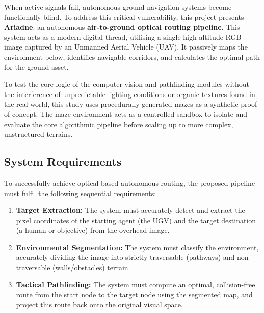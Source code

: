 \documentclass[12pt, a4paper]{article}
\begin{document}
\vspace{0.5cm}

When active signals fail, autonomous ground navigation systems become functionally blind. To address this critical vulnerability, this project presents \textbf{Ariadne}: an autonomous \textbf{air-to-ground optical routing pipeline}. This system acts as a modern digital thread, utilising a single high-altitude RGB image captured by an Unmanned Aerial Vehicle (UAV). It passively maps the environment below, identifies navigable corridors, and calculates the optimal path for the ground asset.

\vspace{0.5cm}

To test the core logic of the computer vision and pathfinding modules without the interference of unpredictable lighting conditions or organic textures found in the real world, this study uses procedurally generated mazes as a synthetic proof-of-concept. The maze environment acts as a controlled sandbox to isolate and evaluate the core algorithmic pipeline before scaling up to more complex, unstructured terrains.

\vspace{0.5cm}

\subsection{System Requirements}

To successfully achieve optical-based autonomous routing, the proposed pipeline must fulfil the following sequential requirements:

\begin{enumerate}
    \item \textbf{Target Extraction:} The system must accurately detect and extract the pixel coordinates of the starting agent (the UGV) and the target destination (a human or objective) from the overhead image.

    \item \textbf{Environmental Segmentation:} The system must classify the environment, accurately dividing the image into strictly traversable (pathways) and non-traversable (walls/obstacles) terrain.

    \item \textbf{Tactical Pathfinding:} The system must compute an optimal, collision-free route from the start node to the target node using the segmented map, and project this route back onto the original visual space.
\end{enumerate}
\end{document}
